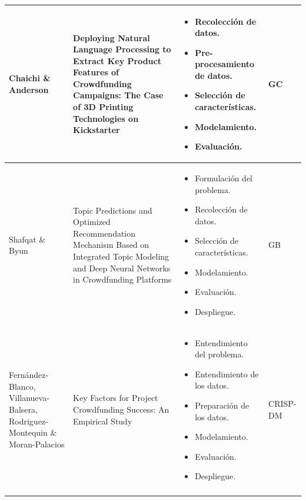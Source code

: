 \begin{longtable}{M{3cm}M{5.5cm}M{5.5cm}M{1.5cm}}
			\hline
			Chaichi \& Anderson
			& Deploying Natural Language Processing to Extract Key Product Features of Crowdfunding Campaigns: The Case of 3D Printing Technologies on Kickstarter
			& 
			\begin{itemize}[label={--},nosep,noitemsep,leftmargin=*,topsep=0pt,partopsep=0pt]
				\item Recolección de datos.
				\item Pre-procesamiento de datos.
				\item Selección de características.
				\item Modelamiento.
				\item Evaluación.
			\end{itemize}
			& GC
			\\
			\hline
			Shafqat \& Byun
			& Topic Predictions and Optimized Recommendation Mechanism Based on Integrated Topic Modeling and Deep Neural Networks in Crowdfunding Platforms
			& 
			\begin{itemize}[label={--},nosep,noitemsep,leftmargin=*,topsep=0pt,partopsep=0pt]
				\item Formulación del problema.
				\item Recolección de datos.
				\item Selección de características.
				\item Modelamiento.
				\item Evaluación.
				\item Despliegue.
			\end{itemize}
			& GB
			\\
			\hline
			Fernández-Blanco, Villanueva-Balsera, Rodriguez-Montequin \& Moran-Palacios
			& Key Factors for Project Crowdfunding Success: An Empirical Study
			& 
			\begin{itemize}[label={--},nosep,noitemsep,leftmargin=*,topsep=0pt,partopsep=0pt]
				\item Entendimiento del problema.
				\item Entendimiento de los datos.
				\item Preparación de los datos.
				\item Modelamiento.
				\item Evaluación.
				\item Despliegue.
			\end{itemize}
			& CRISP-DM
			\\
			\specialrule{.1em}{.05em}{.05em}
		\end{longtable}%
	\endgroup
	\clearpage
	

